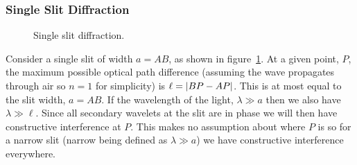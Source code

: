 \documentclass[a4paper]{article}
\begin{document}
    \subsubsection{Single Slit Diffraction}
    \begin{figure}[htb]
        \centering
        \caption{Single slit diffraction.}
        \label{fig:single slit diffraction}
    \end{figure}
    Consider a single slit of width \(a = AB\), as shown in figure~\ref{fig:single slit diffraction}.
    At a given point, \(P\), the maximum possible optical path difference (assuming the wave propagates through air so \(n = 1\) for simplicity) is \(\ell = \abs{BP - AP}\).
    This is at most equal to the slit width, \(a = AB\).
    If the wavelength of the light, \(\lambda \gg a\) then we also have \(\lambda \gg \ell\).
    Since all secondary wavelets at the slit are in phase we will then have constructive interference at \(P\).
    This makes no assumption about where \(P\) is so for a narrow slit (narrow being defined as \(\lambda \gg a\)) we have constructive interference everywhere.
    
\end{document}
